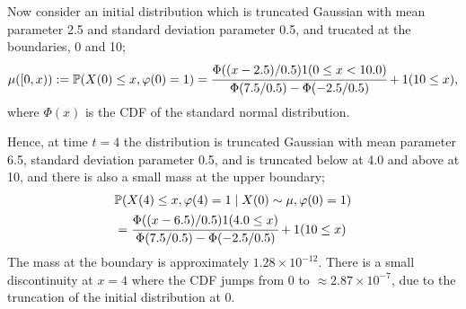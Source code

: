 \begin{example}
	Now consider an initial distribution which is truncated Gaussian with mean parameter 2.5 and standard deviation parameter 0.5, and trucated at the boundaries, 0 and 10;
	\begin{align}
		\mu([0,x)) := \mathbb P(X(0)\leq x, \varphi(0)=1)=\cfrac{\Phi((x-2.5)/0.5)1(0 \leq x < 10.0)}{\Phi(7.5/0.5)-\Phi(-2.5/0.5)} + 1(10\leq x), \label{eqn: kdjfksdf}
	\end{align}
	where \(\Phi(x)\) is the CDF of the standard normal distribution.

	Hence, at time \(t=4\) the distribution is truncated Gaussian with mean parameter 6.5, standard deviation parameter 0.5, and is truncated below at 4.0 and above at 10, and there is also a small mass at the upper boundary; 
	\begin{align}
		&\mathbb P(X(4)\leq x, \varphi(4)=1\mid X(0)\sim\mu, \varphi(0)=1) \nonumber 
		\\&=\cfrac{\Phi((x-6.5)/0.5)1(4.0\leq x)}{\Phi(7.5/0.5)-\Phi(-2.5/0.5)} + 1(10 \leq x)\label{eqn: bbbbbaabbaa}%
	\end{align}
	The mass at the boundary is approximately \(1.28\times 10^{-12}\). There is a small discontinuity at \(x=4\) where the CDF jumps from \(0\) to \(\approx 2.87\times 10^{-7}\), due to the truncation of the initial distribution at \(0\). 


\end{example}
